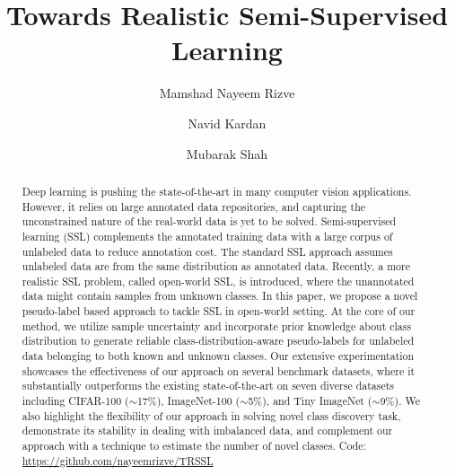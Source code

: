 \documentclass[runningheads]{eccv2022submission}
\begin{document}
\pagestyle{headings}
\mainmatter
\def\ECCVSubNumber{7402}  





\title{Towards Realistic Semi-Supervised Learning} \begin{comment}
\titlerunning{ECCV-22 submission ID \ECCVSubNumber} 
\authorrunning{ECCV-22 submission ID \ECCVSubNumber} 
\author{Anonymous ECCV submission}
\institute{Paper ID \ECCVSubNumber}
\end{comment}


\author{Mamshad Nayeem Rizve \and
Navid Kardan \and
Mubarak Shah}
\maketitle

\begin{abstract}
Deep learning is pushing the state-of-the-art in many computer vision applications. However, it relies on large annotated data repositories, and capturing the unconstrained nature of the real-world data is yet to be solved. Semi-supervised learning (SSL) complements the annotated training data with a large corpus of unlabeled data to reduce annotation cost. The standard SSL approach assumes unlabeled data are from the same distribution as annotated data.  
Recently, a more realistic SSL problem, called open-world SSL, is introduced, where the unannotated data might contain samples from unknown classes. In this paper, we propose a novel pseudo-label based approach to tackle SSL in open-world setting. At the core of our method, we utilize sample uncertainty and incorporate prior knowledge about class distribution to generate reliable class-distribution-aware pseudo-labels for unlabeled data belonging to both known and unknown classes. Our extensive experimentation showcases the effectiveness of our approach on several benchmark datasets, where it substantially outperforms the existing state-of-the-art on seven diverse datasets including CIFAR-100 ($\sim$17\%), ImageNet-100 ($\sim$5\%), and Tiny ImageNet ($\sim$9\%). We also highlight the flexibility of our approach in solving novel class discovery task, demonstrate its stability in dealing with imbalanced data, and complement our approach with a technique to estimate the number of novel classes. Code: \url{https://github.com/nayeemrizve/TRSSL}
\end{abstract}
\end{document}
